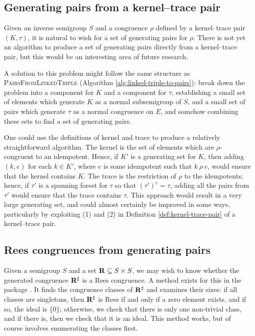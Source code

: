 \subsection{Generating pairs from a kernel--trace pair}
\label{sec:kertr-to-pairs}
Given an inverse semigroup $S$ and a congruence $\rho$ defined by a kernel--trace
pair $(K, \tau)$, it is natural to wish for a set of generating pairs for
$\rho$.  There is not yet an algorithm to produce a set of generating pairs
directly from a kernel--trace pair, but this would be an interesting area of
future research.

A solution to this problem might follow the same structure as
\textsc{PairsFromLinkedTriple} (Algorithm
\ref{alg:linked-triple-to-pairs}): break down the problem into a component for
$K$ and a component for $\tau$, establishing a small set of elements which
generate $K$ as a normal subsemigroup of $S$, and a small set of pairs which
generate $\tau$ as a normal congruence on $E$, and somehow combining these sets
to find a set of generating pairs.

One could use the definitions of kernel and trace to produce a relatively
straightforward algorithm.  The kernel is the set of elements which are
$\rho$-congruent to an idempotent.  Hence, if $K'$ is a generating set for $K$,
then adding $(k,e)$ for each $k \in K'$, where $e$ is some idempotent such that
$k ~\rho~ e$, would ensure that the kernel contains $K$.  The trace is the
restriction of $\rho$ to the idempotents; hence, if $\tau'$ is a spanning forest
for $\tau$ so that $(\tau')^e = \tau$, adding all the pairs from $\tau'$ would
ensure that the trace contains $\tau$.  This approach would result in a very
large generating set, and could almost certainly be improved in some ways,
particularly by exploiting (1) and (2) in Definition \ref{def:kernel-trace-pair}
of a kernel--trace pair.

\subsection{Rees congruences from generating pairs}
\label{sec:pairs-to-rees}
Given a semigroup $S$ and a set $\mathbf{R} \subseteq S \times S$, we may wish to know
whether the generated congruence $\mathbf{R}^\sharp$ is a Rees congruence.  A method exists
for this in the \Semigroups{} package \cite{semigroups}.  It finds the congruence
classes of $\mathbf{R}^\sharp$ and examines their sizes: if all classes are singletons, then
$\mathbf{R}^\sharp$ is Rees if and only if a zero element exists, and if so, the ideal is
$\{0\}$; otherwise, we check that there is only one non-trivial class, and if
there is, then we check that it is an ideal.  This method works, but of course
involves enumerating the classes first.

